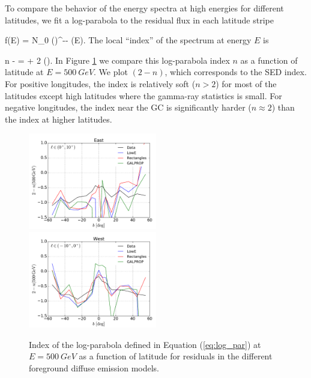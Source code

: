 To compare the behavior of the energy spectra at high energies for different latitudes, 
we fit a log-parabola to the residual flux in each latitude stripe

 \be
 f(E) = N_0 \left(\right)^{-\alpha - \beta \ln(E)}.
 \ee
The local ``index'' of the spectrum at energy $E$ is

\be 
{}
n \equiv -  = \alpha + 2 \beta \ln\left(\right).
\ee
In Figure \ref{fig:logpar_index} we compare this log-parabola index $n$ as a function of latitude at $E = \SI{500}{GeV}$. 
We plot $(2 - n)$, which corresponds to the SED index.
For positive longitudes, the index is relatively soft ($n > 2$) for most of the latitudes
except high latitudes where the gamma-ray statistics is small.
For negative longitudes, the index near the GC
is significantly harder ($n \approx 2$) than the index at higher latitudes.
\begin{figure}[h!]
\includegraphics[width=0.5\textwidth]{plots/LogParabola_n(500GeV)_l_in_(0,10).pdf}
\includegraphics[width=0.5\textwidth]{plots/LogParabola_n(500GeV)_l_in_(-10,0).pdf}
\caption{Index of the log-parabola defined in Equation (\ref{eq:log_par}) at  $E = \SI{500}{GeV}$ as a function of latitude for residuals in 
the different foreground diffuse emission models. 
}
\label{fig:logpar_index}
\end{figure}



